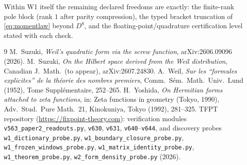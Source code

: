 \documentclass[11pt,a4paper]{article}
\theoremstyle{remark}
\begin{document}
Within W1 itself the remaining declared freedoms are exactly: the
finite-rank pole block (rank $1$ after parity compression), the typed
bracket truncation of \eqref{eq:momentlaw} beyond $D^8$, and the
floating-point/quadrature certification level stated with each check.

\begin{thebibliography}{9}
 M.~Suzuki,
\emph{Weil's quadratic form via the screw function},
arXiv:2606.09096 (2026).
 M.~Suzuki,
\emph{On the Hilbert space derived from the Weil distribution},
Canadian J.\ Math.\ (to appear), arXiv:2607.24830.
 A.~Weil,
\emph{Sur les ``formules explicites'' de la th\'eorie des nombres
premiers}, Comm.\ S\'em.\ Math.\ Univ.\ Lund (1952), Tome
Suppl\'ementaire, 252--265.
 H.~Yoshida,
\emph{On Hermitian forms attached to zeta functions}, in: Zeta
functions in geometry (Tokyo, 1990), Adv.\ Stud.\ Pure Math.\ 21,
Kinokuniya, Tokyo (1992), 281--325.
 TFPT repository
(\url{https://fixpoint-theory.com}): verification modules
\texttt{v563\_paper2\_readouts.py}, \texttt{v630},
\texttt{v631}, \texttt{v640}--\texttt{v644}, and discovery probes
\texttt{w1\_dictionary\_probe.py},
\texttt{w1\_boundary\_closure\_probe.py},
\texttt{w1\_frozen\_windows\_probe.py},
\texttt{w1\_matrix\_identity\_probe.py},
\texttt{w1\_theorem\_probe.py},
\texttt{w2\_form\_density\_probe.py} (2026).
\end{thebibliography}
\end{document}
